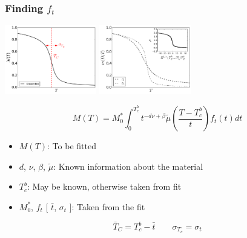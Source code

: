 \documentclass{beamer}
\begin{document}
\begin{frame}
	\frametitle{Finding $f_t$}

	\begin{center}
	\includegraphics[width=4cm]{Images/Aggregate} \hspace{3mm}
	\includegraphics[width=4cm]{Images/Ds}

	$$
	M(T) = M_0^*\int_0^{T_c^b} t^{-d\nu +\beta} \tilde{\mu}\left(\frac{T-T_c^b}{t}\right) f_t(t) dt
	$$

	\begin{itemize}
		\item{$M(T)$: To be fitted}
		\item{$d$, $\nu$, $\beta$, $\tilde{\mu}$: Known information about the material}
		\item{$T_c^b$: May be known, otherwise taken from fit}
		\item{$M_0^*$, $f_t$ [ $\bar{t}$, $\sigma_t$ ]: Taken from the fit}
	\end{itemize}

	$$
	\bar{T}_C = T_c^b - \bar{t} \quad \quad \sigma_{T_c} = \sigma_t
	$$

	\end{center}
\end{frame}
\end{document}
